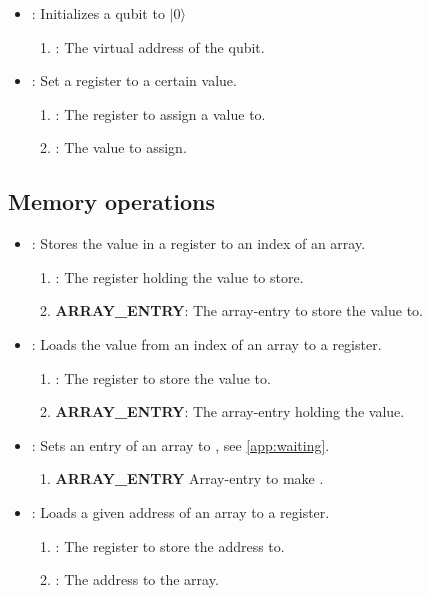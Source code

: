\begin{itemize}
  \item {}: Initializes a qubit to $|0\rangle$
        \begin{enumerate}
          \item \REGISTER: The virtual address of the qubit.
        \end{enumerate}
  \item {}: Set a register to a certain value.
        \begin{enumerate}
          \item \REGISTER: The register to assign a value to.
          \item \IMMEDIATE: The value to assign.
        \end{enumerate}
\end{itemize}

\subsection{Memory operations}
\begin{itemize}
  \item {}: Stores the value in a register to an index of an array.
        \begin{enumerate}
          \item \REGISTER: The register holding the value to store.
          \item \textbf{ARRAY\_ENTRY}: The array-entry to store the value to.
        \end{enumerate}
  \item {}: Loads the value from an index of an array to a register.
        \begin{enumerate}
          \item \REGISTER: The register to store the value to.
          \item \textbf{ARRAY\_ENTRY}: The array-entry holding the value.
        \end{enumerate}
  \item {}: Sets an entry of an array to , see \cref{app:waiting}.
        \begin{enumerate}
          \item \textbf{ARRAY\_ENTRY} Array-entry to make .
        \end{enumerate}
  \item {}: Loads a given address of an array to a register.
        \begin{enumerate}
          \item \REGISTER: The register to store the address to.
          \item \ADDRESS: The address to the array.
        \end{enumerate}
\end{itemize}

